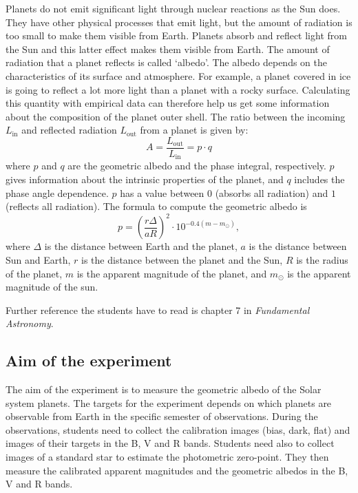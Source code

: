\documentclass[a4paper, 11pt, fleqn]{memoir}
\begin{document}
Planets do not emit significant light through nuclear reactions as the Sun does.
They have other physical processes that emit light, but the amount of radiation is too small to make them visible from Earth.
Planets absorb and reflect light from the Sun and this latter effect makes them visible from Earth.
The amount of radiation that a planet reflects is called `albedo'.
The albedo depends on the characteristics of its surface and atmosphere.
For example, a planet covered in ice is going to reflect a lot more light than a planet with a rocky surface.
Calculating this quantity with empirical data can therefore help us get some information about the composition of the planet outer shell.
The ratio between the incoming $L_\text{in}$ and reflected radiation $L_\mathrm{out}$ from a planet is given by:
\begin{equation}
    A = \frac{L_\text{out}}{L_\text{in}} = p \cdot q
\end{equation}
where
$p$ and $q$ are the geometric albedo and the phase integral, respectively.
$p$ gives information about the intrinsic properties of the planet, and
$q$ includes the phase angle dependence.
$p$ has a value between $0$ (absorbs all radiation) and $1$ (reflects all radiation).
The formula to compute the geometric albedo is
\begin{equation}
    p = \left ( \frac{r \Delta}{a R} \right)^2 \cdot 10^{-0.4(m - m_{\odot})},
\end{equation}
where $\Delta$ is the distance between Earth and the planet,
$a$ is the distance between Sun and Earth,
$r$ is the distance between the planet and the Sun,
$R$ is the radius of the planet,
$m$ is the apparent magnitude of the planet,
and $m_{\odot}$ is the apparent magnitude of the sun.

Further reference the students have to read is chapter 7 in \emph{Fundamental Astronomy}\autocite{Karttunen2016FundamentalAstronomy}.

\subsection{Aim of the experiment}

The aim of the experiment is to measure the geometric albedo of the Solar system planets.
The targets for the experiment depends on which planets are observable from Earth in the specific semester of observations.
During the observations, students need to collect the calibration images (bias, dark, flat) and images of their targets in the B, V and R bands.
Students need also to collect images of a standard star to estimate the photometric zero-point.
They then measure the calibrated apparent magnitudes and the geometric albedos in the B, V and R bands.
\end{document}
